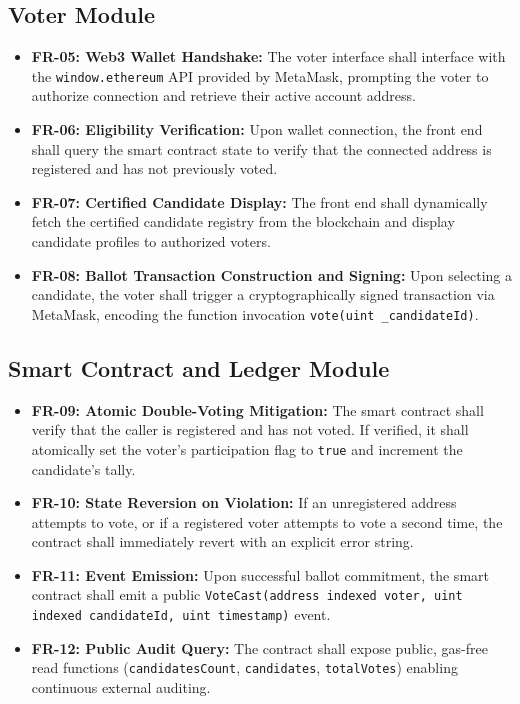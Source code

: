 \documentclass[12pt,a4paper]{report}
\begin{document}
\subsection{Voter Module}
\begin{itemize}
    \item \textbf{FR-05: Web3 Wallet Handshake:} The voter interface shall interface with the \texttt{window.ethereum} API provided by MetaMask, prompting the voter to authorize connection and retrieve their active account address.
    \item \textbf{FR-06: Eligibility Verification:} Upon wallet connection, the front end shall query the smart contract state to verify that the connected address is registered and has not previously voted.
    \item \textbf{FR-07: Certified Candidate Display:} The front end shall dynamically fetch the certified candidate registry from the blockchain and display candidate profiles to authorized voters.
    \item \textbf{FR-08: Ballot Transaction Construction and Signing:} Upon selecting a candidate, the voter shall trigger a cryptographically signed transaction via MetaMask, encoding the function invocation \texttt{vote(uint \_candidateId)}.
\end{itemize}

\subsection{Smart Contract and Ledger Module}
\begin{itemize}
    \item \textbf{FR-09: Atomic Double-Voting Mitigation:} The smart contract shall verify that the caller is registered and has not voted. If verified, it shall atomically set the voter's participation flag to \texttt{true} and increment the candidate's tally.
    \item \textbf{FR-10: State Reversion on Violation:} If an unregistered address attempts to vote, or if a registered voter attempts to vote a second time, the contract shall immediately revert with an explicit error string.
    \item \textbf{FR-11: Event Emission:} Upon successful ballot commitment, the smart contract shall emit a public \texttt{VoteCast(address indexed voter, uint indexed candidateId, uint timestamp)} event.
    \item \textbf{FR-12: Public Audit Query:} The contract shall expose public, gas-free read functions (\texttt{candidatesCount}, \texttt{candidates}, \texttt{totalVotes}) enabling continuous external auditing.
\end{itemize}
\end{document}
